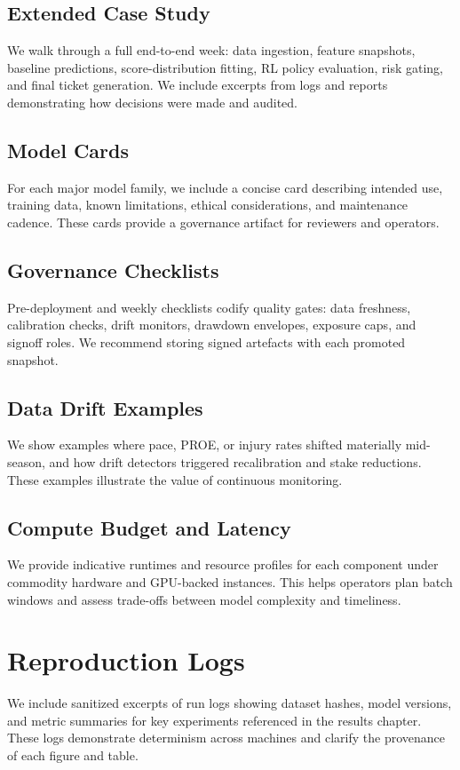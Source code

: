 \documentclass[12pt]{report}  %
\numberwithin{equation}{section}
\theoremstyle{plain}
\theoremstyle{definition}
\theoremstyle{remark}
\begin{document}
\section{Extended Case Study}
We walk through a full end-to-end week: data ingestion, feature snapshots, baseline predictions, score-distribution fitting, RL policy evaluation, risk gating, and final ticket generation. We include excerpts from logs and reports demonstrating how decisions were made and audited.

\section{Model Cards}
For each major model family, we include a concise card describing intended use, training data, known limitations, ethical considerations, and maintenance cadence. These cards provide a governance artifact for reviewers and operators.

\section{Governance Checklists}
Pre-deployment and weekly checklists codify quality gates: data freshness, calibration checks, drift monitors, drawdown envelopes, exposure caps, and signoff roles. We recommend storing signed artefacts with each promoted snapshot.

\section{Data Drift Examples}
We show examples where pace, PROE, or injury rates shifted materially mid-season, and how drift detectors triggered recalibration and stake reductions. These examples illustrate the value of continuous monitoring.

\section{Compute Budget and Latency}
We provide indicative runtimes and resource profiles for each component under commodity hardware and GPU-backed instances. This helps operators plan batch windows and assess trade-offs between model complexity and timeliness.

\iffalse %
\chapter{Reproduction Logs}
We include sanitized excerpts of run logs showing dataset hashes, model versions, and metric summaries for key experiments referenced in the results chapter. These logs demonstrate determinism across machines and clarify the provenance of each figure and table.
\end{document}
